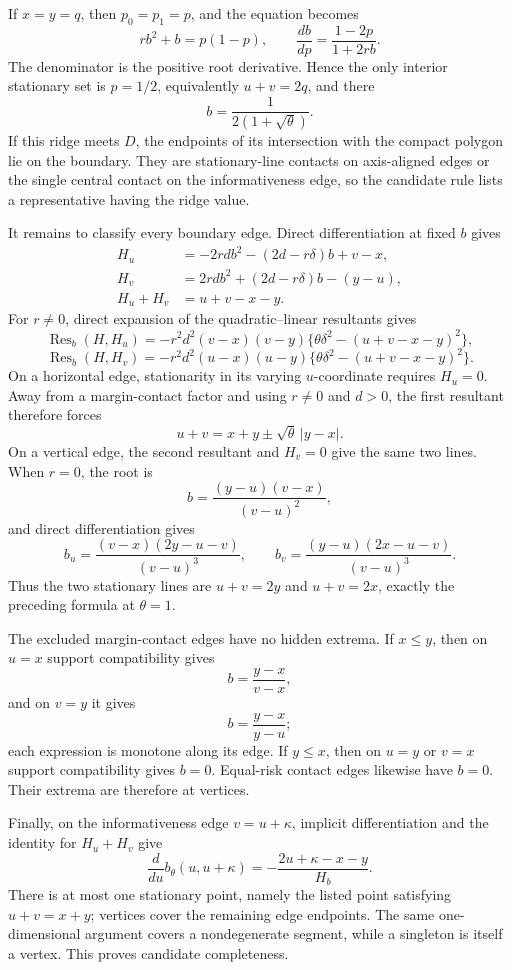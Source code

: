 If \(x=y=q\), then \(p_0=p_1=p\), and the equation becomes
\[
r b^2+b=p(1-p),
\qquad
\frac{db}{dp}=\frac{1-2p}{1+2rb}.
\]
The denominator is the positive root derivative. Hence the only interior stationary set is \(p=1/2\), equivalently \(u+v=2q\), and there
\[
b=\frac{1}{2(1+\sqrt\theta)}.
\]
If this ridge meets \(D\), the endpoints of its intersection with the compact polygon lie on the boundary. They are stationary-line contacts on axis-aligned edges or the single central contact on the informativeness edge, so the candidate rule lists a representative having the ridge value.

It remains to classify every boundary edge. Direct differentiation at fixed \(b\) gives
\[
\begin{aligned}
H_u&=-2rdb^2-(2d-r\delta)b+v-x,\\
H_v&= 2rdb^2+(2d-r\delta)b-(y-u),\\
H_u+H_v&=u+v-x-y.
\end{aligned}
\]
For \(r\neq0\), direct expansion of the quadratic--linear resultants gives
\[
\operatorname{Res}_b(H,H_u)
=-r^2d^2(v-x)(v-y)
\{\theta\delta^2-(u+v-x-y)^2\},
\]
\[
\operatorname{Res}_b(H,H_v)
=-r^2d^2(u-x)(u-y)
\{\theta\delta^2-(u+v-x-y)^2\}.
\]
On a horizontal edge, stationarity in its varying \(u\)-coordinate requires \(H_u=0\). Away from a margin-contact factor and using \(r\neq0\) and \(d>0\), the first resultant therefore forces
\[
u+v=x+y\pm\sqrt\theta\,|y-x|.
\]
On a vertical edge, the second resultant and \(H_v=0\) give the same two lines. When \(r=0\), the root is
\[
b=\frac{(y-u)(v-x)}{(v-u)^2},
\]
and direct differentiation gives
\[
b_u=\frac{(v-x)(2y-u-v)}{(v-u)^3},
\qquad
b_v=\frac{(y-u)(2x-u-v)}{(v-u)^3}.
\]
Thus the two stationary lines are \(u+v=2y\) and \(u+v=2x\), exactly the preceding formula at \(\theta=1\).

The excluded margin-contact edges have no hidden extrema. If \(x\leq y\), then on \(u=x\) support compatibility gives
\[
b=\frac{y-x}{v-x},
\]
and on \(v=y\) it gives
\[
b=\frac{y-x}{y-u};
\]
each expression is monotone along its edge. If \(y\leq x\), then on \(u=y\) or \(v=x\) support compatibility gives \(b=0\). Equal-risk contact edges likewise have \(b=0\). Their extrema are therefore at vertices.

Finally, on the informativeness edge \(v=u+\kappa\), implicit differentiation and the identity for \(H_u+H_v\) give
\[
\frac{d}{du}b_\theta(u,u+\kappa)
=-\frac{2u+\kappa-x-y}{H_b}.
\]
There is at most one stationary point, namely the listed point satisfying \(u+v=x+y\); vertices cover the remaining edge endpoints. The same one-dimensional argument covers a nondegenerate segment, while a singleton is itself a vertex. This proves candidate completeness.

